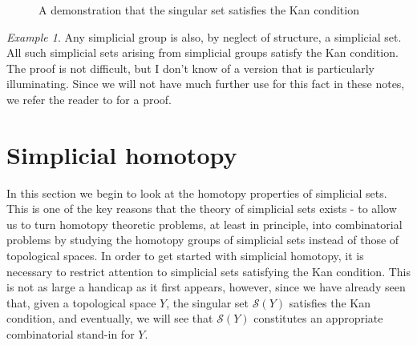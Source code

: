 \documentclass[12pt]{article}
\theoremstyle{plain}
\theoremstyle{definition}
\theoremstyle{remark}
\newtheorem{example}[theorem]{Example}
\newcommand{\ms}[1]{\mathscr{#1}}
\begin{document}
\begin{figure}[!htp]
\begin{center}
\end{center}
\caption{A demonstration that the singular set satisfies the Kan condition}\label{F: fig19}
\end{figure}
\begin{example}
Any simplicial group is also, by neglect of structure, a simplicial set. All such simplicial sets arising from simplicial  groups satisfy the Kan condition. The proof is not difficult, but I don't know of a version that is particularly illuminating. Since we will not have much further use for this fact in these notes, we refer the reader to \cite[Theorem 2.2]{MOORE} for a proof. 
\end{example}












\section{Simplicial homotopy}\label{S: simp homotopy}

In this section we begin to look at the homotopy properties of simplicial sets. This is one of the key reasons that the theory of simplicial sets exists - to allow us to turn homotopy theoretic problems, at least in principle, into combinatorial problems by studying the homotopy groups of simplicial sets instead of those of topological spaces. In order to get started with simplicial homotopy, it is necessary to restrict attention to simplicial sets satisfying the Kan condition. This is not as large a handicap as it first appears, however, since we have already seen that, given a topological space $Y$, the singular set $\ms S(Y)$ satisfies the Kan condition, and eventually, we will see that $\ms S(Y)$  constitutes an appropriate combinatorial stand-in for $Y$. 
\end{document}
